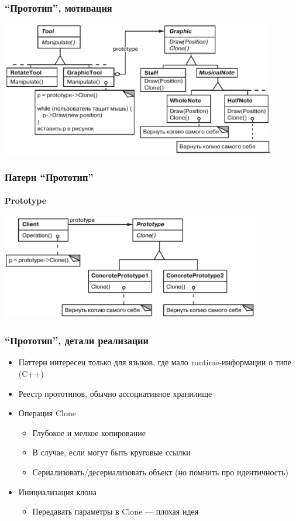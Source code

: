 \documentclass[xetex,mathserif,serif]{beamer}
\begin{document}
	\begin{frame}
		\frametitle{``Прототип'', мотивация}
		\begin{center}
			\includegraphics[width=0.9\textwidth]{musicalEditor.png}
		\end{center}
	\end{frame}

	\begin{frame}
		\frametitle{Патерн ``Прототип''}
		\framesubtitle{Prototype}
		\begin{center}
			\includegraphics[width=0.85\textwidth]{prototype.png}
		\end{center}
	\end{frame}
	
	\begin{frame}
		\frametitle{``Прототип'', детали реализации}
		\begin{itemize}
			\item Паттерн интересен только для языков, где мало runtime-информации о типе (C++)
			\item Реестр прототипов, обычно ассоциативное хранилище
			\item Операция Clone
			\begin{itemize}
				\item Глубокое и мелкое копирование
				\item В случае, если могут быть круговые ссылки
				\item Сериализовать/десериализовать объект (но помнить про идентичность)
			\end{itemize}
			\item Инициализация клона
			\begin{itemize}
				\item Передавать параметры в Clone --- плохая идея
			\end{itemize}
		\end{itemize}
	\end{frame}
\end{document}
